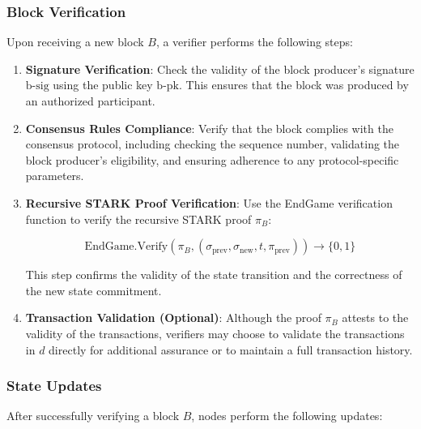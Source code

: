 \documentclass{article}
\theoremstyle{plain}
\theoremstyle{definition}
\theoremstyle{remark}
\theoremstyle{problem}
\begin{document}
\subsubsection{Block Verification}

Upon receiving a new block $B$, a verifier performs the following steps:

\begin{enumerate}
    \item \textbf{Signature Verification}: Check the validity of the block producer's signature $\text{b-sig}$ using the public key $\text{b-pk}$. This ensures that the block was produced by an authorized participant.

    \item \textbf{Consensus Rules Compliance}: Verify that the block complies with the consensus protocol, including checking the sequence number, validating the block producer's eligibility, and ensuring adherence to any protocol-specific parameters.

    \item \textbf{Recursive STARK Proof Verification}: Use the EndGame verification function to verify the recursive STARK proof $\pi_B$:

    \[
    \text{EndGame.Verify}(\pi_B, (\sigma_{\text{prev}}, \sigma_{\text{new}}, t, \pi_{\text{prev}})) \to \{0,1\}
    \]

    This step confirms the validity of the state transition and the correctness of the new state commitment.

    \item \textbf{Transaction Validation (Optional)}: Although the proof $\pi_B$ attests to the validity of the transactions, verifiers may choose to validate the transactions in $d$ directly for additional assurance or to maintain a full transaction history.
\end{enumerate}

\subsubsection{State Updates}

After successfully verifying a block $B$, nodes perform the following updates:
\end{document}
